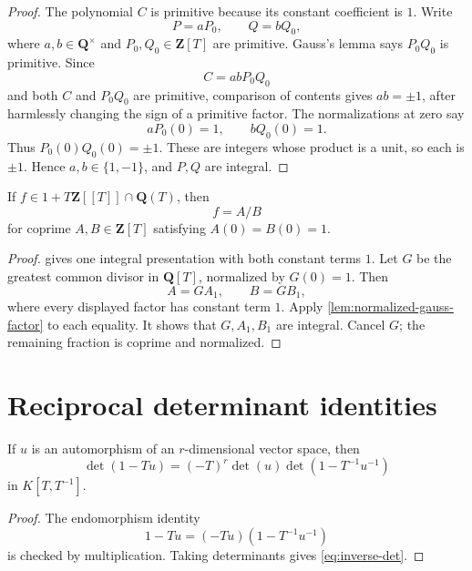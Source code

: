 \begin{proof}
The polynomial \(C\) is primitive because its constant coefficient is
\(1\).  Write
\[
 P=aP_0,\qquad Q=bQ_0,
\]
where \(a,b\in\mathbf Q^\times\) and \(P_0,Q_0\in\mathbf Z[T]\) are
primitive.  Gauss's lemma says \(P_0Q_0\) is primitive.  Since
\[
 C=abP_0Q_0
\]
and both \(C\) and \(P_0Q_0\) are primitive, comparison of contents gives
\(ab=\pm1\), after harmlessly changing the sign of a primitive factor.
The normalizations at zero say
\[
 aP_0(0)=1,\qquad bQ_0(0)=1.
\]
Thus \(P_0(0)Q_0(0)=\pm1\).  These are integers whose product is a unit,
so each is \(\pm1\).  Hence \(a,b\in\{1,-1\}\), and \(P,Q\) are integral.
\end{proof}

\begin{corollary}
\label{cor:reduced-integral-presentation}
If \(f\in1+T\mathbf Z[[T]]\cap\mathbf Q(T)\), then
\[
 f=A/B
\]
for coprime \(A,B\in\mathbf Z[T]\) satisfying
\(A(0)=B(0)=1\).
\end{corollary}

\begin{proof}
 gives one integral presentation with both
constant terms \(1\).  Let \(G\) be the greatest common divisor in
\(\mathbf Q[T]\), normalized by \(G(0)=1\).  Then
\[
 A=GA_1,\qquad B=GB_1,
\]
where every displayed factor has constant term \(1\).  Apply
\cref{lem:normalized-gauss-factor} to each equality.  It shows that
\(G,A_1,B_1\) are integral.  Cancel \(G\); the remaining fraction is
coprime and normalized.
\end{proof}

\section{Reciprocal determinant identities}

\begin{lemma}
\label{lem:inverse-determinant}
If \(u\) is an automorphism of an \(r\)-dimensional vector space, then
\[
 \det(1-Tu)=(-T)^r\det(u)\det(1-T^{-1}u^{-1})
 \tag{2.10}\label{eq:inverse-det}
\]
in \(K[T,T^{-1}]\).
\end{lemma}

\begin{proof}
The endomorphism identity
\[
 1-Tu=(-Tu)(1-T^{-1}u^{-1})
\]
is checked by multiplication.  Taking determinants gives
\eqref{eq:inverse-det}.
\end{proof}

